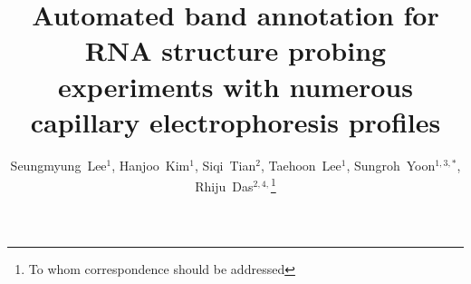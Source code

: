 \documentclass[letter]{bioinfo}
\begin{document}

\title[Automated band annotation for capillary electrophoresis]{Automated band annotation for RNA structure probing experiments with numerous capillary electrophoresis profiles}
\author[Lee \textit{et~al}]
{
Seungmyung~Lee$^{1}$,
Hanjoo~Kim$^{1}$,
Siqi~Tian$^{2}$,
Taehoon~Lee$^{1}$,
Sungroh~Yoon$^{1,3,*}$,
Rhiju~Das$^{2,4,}$\footnote{To whom correspondence should be addressed}
}
\address{
$^{1}$Department of ECE, Seoul National University, Seoul 151-744, Korea
$^{2}$Department of Biochemistry, Stanford University School of Medicine, Stanford, CA 94305, USA
$^{3}$Interdisciplinary Program in Bionformatics, Seoul National University, Seoul 151-744, Korea
$^{4}$Department of Physics, Stanford University, Stanford, CA 94305, USA
}

\history{}


\maketitle
\end{document}
